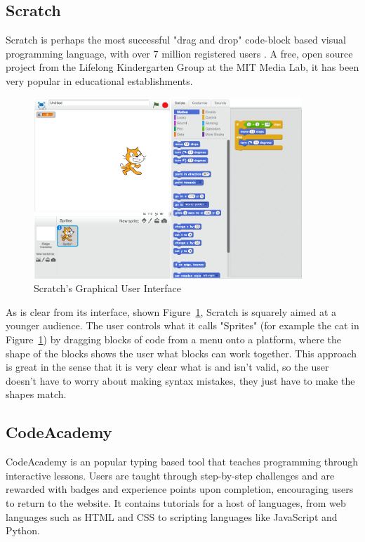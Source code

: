 \documentclass[ %
                    author={Jonathan Rankin},
                supervisor={Dr. David May, Dr. Ian Holyer},
                    degree={MEng},
                     title={CodeTouch},
                  subtitle={A Revolutionary Way To Program Real Code On Touch Screen Devices},
                      type={enterprise},
                      year={2015 } ]{dissertation}
\begin{document}
\subsection{Scratch}\label{ssec:Scratch}
Scratch is perhaps the most successful "drag and drop" code-block based visual programming language, with over 7 million registered users \cite{scratchWebsite}. A free, open source project from the Lifelong Kindergarten Group at the MIT Media Lab, it has been very popular in educational establishments.

\begin{figure}[h]
\centering
\includegraphics[width=0.9\textwidth]{scratch}
\caption{Scratch's Graphical User Interface}
\label{fig:scratchh}
\end{figure}

As is clear from its interface, shown Figure~\ref{fig:scratchh}, Scratch is squarely aimed at a younger audience. The user controls what it calls "Sprites" (for example the cat in Figure~\ref{fig:scratchh}) by dragging blocks of code from a menu onto a platform, where the shape of the blocks shows the user what blocks can work together. This approach is great in the sense that it is very clear what is and isn't valid, so the user doesn't have to worry about making syntax mistakes, they just have to make the shapes match. 

\subsection{CodeAcademy}\label{ssec:CodeAcademy}
CodeAcademy is an popular typing based tool that teaches programming through interactive lessons. Users are taught through step-by-step challenges and are rewarded with badges and experience points upon completion, encouraging users to return to the website. It contains tutorials for a host of languages, from web languages such as HTML and CSS to scripting languages like JavaScript and Python. 
\end{document}
